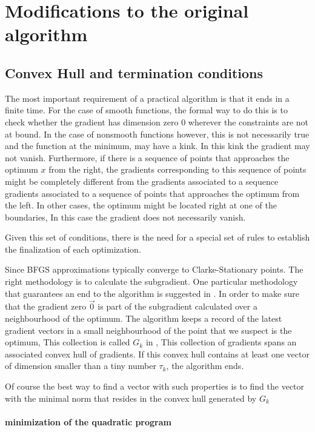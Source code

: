 \chapter{Modifications to the original algorithm}

\section{Convex Hull and termination conditions}

The most important requirement of a practical algorithm is that it ends in a finite time. For the case of smooth functions, the formal way to do this is to check whether the gradient has dimension zero $0$ wherever the constraints are not at bound. In the case of nonsmooth functions however, this is not necessarily true and the function at the minimum, may have a kink. In this kink the gradient may not vanish. Furthermore, if there is a sequence of points that approaches the optimum $x$ from the right, the gradients corresponding to this sequence of points might be completely different from the gradients associated to a sequence gradients associated to a sequence of points that approaches the optimum from the left. In other cases, the optimum might be located right at one of the boundaries, In this case the gradient does not necessarily vanish.

Given this set of conditions, there is the need for a special set of rules to establish the finalization of each optimization.

Since BFGS approximations typically converge to Clarke-Stationary points. The right methodology is to calculate the subgradient. One particular methodology that guarantees an end to the algorithm is suggested in \citep{overtonlewis}. In order to make sure that the gradient zero $\vec{0}$ is part of the subgradient calculated over a neighbourhood of the optimum.
The algorithm keeps a record of the latest gradient vectors in a small neighbourhood of the point that we suspect is the optimum, This collection is called $G_k$ in \citep{overtonlewis}, This collection of gradients spans an associated convex hull of gradients. If this convex hull contains at least one vector of dimension smaller than a tiny number $\tau_k$, the algorithm ends.

Of course the best way to find a vector with such properties is to find the vector with the minimal norm that resides in the convex hull generated by $G_k$

\subsubsection{minimization of the quadratic program}

